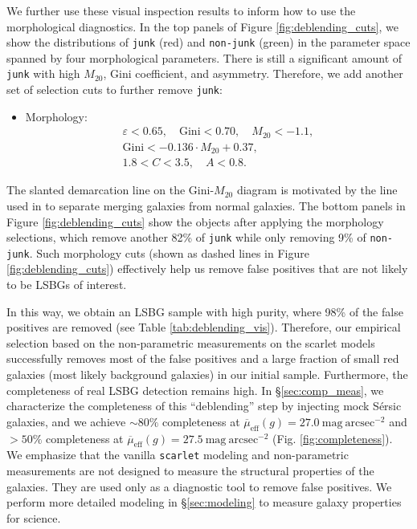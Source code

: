\documentclass[twocolumn,astrosymb,twocolappendix,linenumbers]{aastex631}
\newcommand{\sbunit}{\mathrm{mag\ arcsec}^{-2}}
\newcommand{\sbeff}{\overline{\mu}_{\mathrm{eff}}(g)}
\newcommand{\code}[1]{\texttt{#1}}
\newcommand{\sersic}{S\'ersic}
\begin{document}
\begin{CJK*}{UTF8}{gbsn}
We further use these visual inspection results to inform how to use the morphological diagnostics. In the top panels of Figure \ref{fig:deblending_cuts}, we show the distributions of \code{junk} (red) and \code{non-junk} (green) in the parameter space spanned by four morphological parameters. There is still a significant amount of \code{junk} with high $M_{20}$, Gini coefficient, and asymmetry. Therefore, we add another set of selection cuts to further remove \code{junk}:
\begin{itemize}
    \item Morphology: 
    \begin{gather*}
        \varepsilon < 0.65,\quad \mathrm{Gini} < 0.70,\quad M_{20} < -1.1,\\
        \mathrm{Gini} < -0.136\cdot M_{20} + 0.37,\\
        1.8 < C < 3.5,\quad A < 0.8.
    \end{gather*}
\end{itemize}
The slanted demarcation line on the Gini-$M_{20}$ diagram is motivated by the line used in \citet{Lotz2008} to separate merging galaxies from normal galaxies. The bottom panels in Figure \ref{fig:deblending_cuts} show the objects after applying the morphology selections, which remove another 82\% of \code{junk} while only removing 9\% of \code{non-junk}. Such morphology cuts (shown as dashed lines in Figure \ref{fig:deblending_cuts}) effectively help us remove false positives that are not likely to be LSBGs of interest. 

In this way, we obtain an LSBG sample with high purity, where 98\% of the false positives are removed (see Table \ref{tab:deblending_vis}). Therefore, our empirical selection based on the non-parametric measurements on the scarlet models successfully removes most of the false positives and a large fraction of small red galaxies (most likely background galaxies) in our initial sample. Furthermore, the completeness of real LSBG detection remains high. In \S\ref{sec:comp_meas}, we characterize the completeness of this ``deblending'' step by injecting mock \sersic{} galaxies, and we achieve $\sim80\%$ completeness at $\sbeff = 27.0\ \sbunit$ and $>50\%$ completeness at $\sbeff = 27.5\ \sbunit$ (Fig. \ref{fig:completeness}). We emphasize that the vanilla \code{scarlet} modeling and non-parametric measurements are not designed to measure the structural properties of the galaxies. They are used only as a diagnostic tool to remove false positives. We perform more detailed modeling in \S\ref{sec:modeling} to measure galaxy properties for science. 


\end{CJK*}
\end{document}
